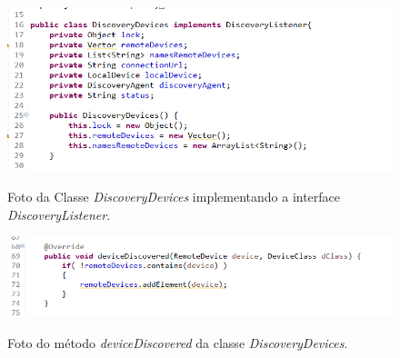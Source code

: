 \begin{figure}[!ht]
\centering
\caption{Foto da Classe \textit{DiscoveryDevices} implementando a interface \textit{DiscoveryListener}.} 
{\includegraphics[scale=.94]{imagens/pacoteBluetooth-DiscoveryDevices_DiscoveryListener.png}}\\
 \label{Fig:discovery_devices}
\end{figure}

\begin{figure}[!ht]
\centering
\caption{Foto do método \textit{deviceDiscovered} da classe \textit{DiscoveryDevices}.} 
{\includegraphics[scale=.78]{imagens/pacoteBluetooth-DiscoveryDevices_deviceDiscovered.png}}\\
 \label{Fig:device_discovered}
\end{figure}

